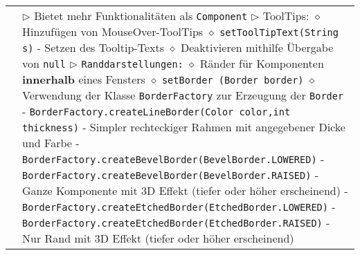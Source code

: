\begin{longtable}{ | p{} p{} | }
	\makecell[l]{Klasse JComponent} & \makecell[l]{
	$\rhd$ Bietet mehr Funktionalitäten als \texttt{Component} \\
	$\rhd$ ToolTips: \\
	\hspace{0.4cm} $\diamond$ Hinzufügen von MouseOver-ToolTips \\
	\hspace{0.4cm} $\diamond$ \texttt{setToolTipText(String s)} \\
	\hspace{0.6cm} - Setzen des Tooltip-Texts \\
	\hspace{0.4cm} $\diamond$ Deaktivieren mithilfe Übergabe von \texttt{null} \\
	$\rhd$ \texttt{Randdarstellungen:} \\
	\hspace{0.4cm} $\diamond$ Ränder für Komponenten \textbf{innerhalb} eines Fensters \\
	\hspace{0.4cm} $\diamond$ \texttt{setBorder (Border border)} \\
	\hspace{0.4cm} $\diamond$ Verwendung der Klasse \texttt{BorderFactory} zur Erzeugung der \texttt{Border} \\
	\hspace{0.6cm} - \texttt{BorderFactory.createLineBorder(Color color,int thickness)} \\
	\hspace{0.8cm} - Simpler rechteckiger Rahmen mit angegebener Dicke und Farbe \\
	\hspace{0.6cm} - \texttt{BorderFactory.createBevelBorder(BevelBorder.LOWERED)} \\
	\hspace{0.6cm} - \texttt{BorderFactory.createBevelBorder(BevelBorder.RAISED)} \\
	\hspace{0.8cm} - Ganze Komponente mit 3D Effekt (tiefer oder höher erscheinend) \\
	\hspace{0.6cm} - \texttt{BorderFactory.createEtchedBorder(EtchedBorder.LOWERED)} \\
	\hspace{0.6cm} - \texttt{BorderFactory.createEtchedBorder(EtchedBorder.RAISED)} \\
	\hspace{0.8cm} - Nur Rand mit 3D Effekt (tiefer oder höher erscheinend) \\
}
\end{longtable}
